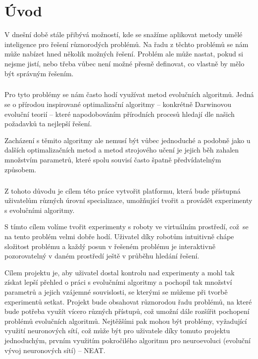 \chapter*{Úvod}

V dnešní době stále přibývá možností, kde se snažíme aplikovat metody umělé
inteligence pro řešení různorodých problémů. Na řadu z těchto problémů se nám
může nabízet hned několik možných řešení. Problém ale může nastat, pokud si
nejsme jistí, nebo třeba vůbec není možné přesně definovat, co vlastně by mělo
být správným řešením.

\paragraph{}
Pro tyto problémy se nám často hodí využívat metod evolučních algoritmů. Jedná
se o přírodou inspirované optimalizační algoritmy -- konkrétně Darwinovou
evoluční teorií -- které napodobováním přírodních procesů hledají dle našich
požadavků ta nejlepší řešení.

Zacházení s těmito algoritmy ale nemusí být vůbec jednoduché a podobně jako u
dalších optimalizačních metod a metod strojového učení je jejich běh zahalen
množstvím parametrů, které spolu souvisí často špatně předvídatelným způsobem.

\paragraph{}
Z tohoto důvodu je cílem této práce vytvořit platformu, která bude přístupná
uživatelům různých úrovní specializace, umožňující tvořit a provádět
experimenty s evolučními algoritmy. 

S tímto cílem volíme tvořit experimenty s roboty ve virtuálním prostředí,
což~se na tento problém velmi dobře hodí. Uživatel díky robotům intuitivně
chápe složitost problému a každý posun v řešeném problému je interaktivně
pozorovatelný v daném prostředí ještě v průběhu hledání řešení.

Cílem projektu je, aby uživatel dostal kontrolu nad experimenty a mohl tak
získat lepší přehled o práci s evolučními algoritmy a pochopil tak množství
parametrů a jejich vzájemné souvislosti, se kterými se můžeme při tvorbě
experimentů setkat. Projekt bude obsahovat různorodou řadu problémů, na které
bude potřeba využít vícero různých přístupů, což umožní dále rozšířit pochopení
problémů evolučních algoritmů. Nejtěžšími pak mohou být problémy, vyžadující
využití neuronových sítí, což může být pro uživatele díky tomuto projektu
jednoduchým, prvním využitím pokročilého algoritmu pro neuroevoluci (evoluční
vývoj neuronových sítí) -- NEAT.


